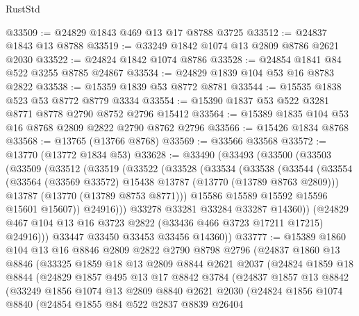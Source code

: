 \begin{lexlean}{RustStd}
\begin{coremodule}
@33509 := @24829 @1843 @469 @13 @17 @8788 @3725
@33512 := @24837 @1843 @13 @8788
@33519 := @33249 @1842 @1074 @13 @2809 @8786 @2621 @2030
@33522 := @24824 @1842 @1074 @8786
@33528 := @24854 @1841 @84 @522 @3255 @8785 @24867
@33534 := @24829 @1839 @104 @53 @16 @8783 @2822
@33538 := @15359 @1839 @53 @8772 @8781
@33544 := @15535 @1838 @523 @53 @8772 @8779 @3334
@33554 := @15390 @1837 @53 @522 @3281 @8771 @8778 @2790 @8752 @2796 @15412
@33564 := @15389 @1835 @104 @53 @16 @8768 @2809 @2822 @2790 @8762 @2796
@33566 := @15426 @1834 @8768
@33568 := @13765 (@13766 @8768)
@33569 := @33566 @33568
@33572 := @13770 (@13772 @1834 @53)
@33628 := @33490
    (@33493
      (@33500
        (@33503
          (@33509
            (@33512
              (@33519
                (@33522
                  (@33528
                    (@33534
                      (@33538
                        (@33544
                          (@33554
                            (@33564 (@33569 @33572) @15438 @13787 (@13770 (@13789 @8763 @2809)))
                            @13787
                            (@13770 (@13789 @8753 @8771)))
                          @15586
                          @15589
                          @15592
                          @15596
                          @15601
                          @15607))
                      @24916)))
                @33278
                @33281
                @33284
                @33287
                @14360))
            (@24829 @467 @104 @13 @16 @3723 @2822 (@33436 @466 @3723 @17211 @17215) @24916)))
        @33447
        @33450
        @33453
        @33456
        @14360))
@33777 := @15389
    @1860
    @104
    @13
    @16
    @8846
    @2809
    @2822
    @2790
    @8798
    @2796
    (@24837
      @1860
      @13
      @8846
      (@33325
        @1859
        @18
        @13
        @2809
        @8844
        @2621
        @2037
        (@24824
          @1859
          @18
          @8844
          (@24829
            @1857
            @495
            @13
            @17
            @8842
            @3784
            (@24837
              @1857
              @13
              @8842
              (@33249
                @1856
                @1074
                @13
                @2809
                @8840
                @2621
                @2030
                (@24824
                  @1856
                  @1074
                  @8840
                  (@24854
                    @1855
                    @84
                    @522
                    @2837
                    @8839
                    @26404

\end{coremodule}
\end{lexlean}
